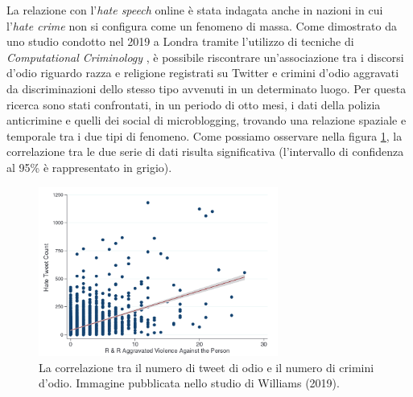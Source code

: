 La relazione con l'\textit{hate speech} online è stata indagata anche in nazioni in cui l'\textit{hate crime} non si configura come un fenomeno di massa. Come dimostrato da uno studio condotto nel 2019 a Londra tramite l'utilizzo di tecniche di \textit{Computational Criminology} \citep{williams2019}, è possibile riscontrare un'associazione tra i discorsi d'odio riguardo razza e religione registrati su Twitter e crimini d'odio aggravati da discriminazioni dello stesso tipo avvenuti in un determinato luogo. Per questa ricerca sono stati confrontati, in un periodo di otto mesi, i dati della polizia anticrimine e quelli dei social di microblogging, trovando una relazione spaziale e temporale tra i due tipi di fenomeno. Come possiamo osservare nella figura \ref{fig:hatetweet}, la correlazione tra le due serie di dati risulta significativa (l'intervallo di confidenza al 95\% è rappresentato in grigio).
\begin{figure}
	\centering
	\includegraphics[width=0.7\textwidth]{figures/hatetweet}
	\caption{La correlazione tra il numero di tweet di odio e il numero di crimini d'odio. Immagine pubblicata nello studio di Williams (2019).}
	\label{fig:hatetweet}
\end{figure}

